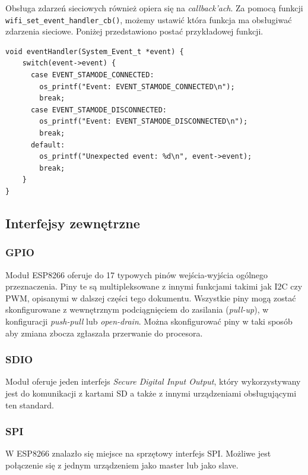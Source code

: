 Obsługa zdarzeń sieciowych również opiera się na \textit{callback'ach}. Za pomocą 
funkcji \verb+wifi_set_event_handler_cb()+, możemy ustawić która funkcja ma 
obsługiwać zdarzenia sieciowe. Poniżej przedstawiono postać przykładowej funkcji.\\

\begin{lstlisting}[style=customc,
    frame=single,
    caption={Przykładowa postać funkcji obsługującej zdarzenia sieciowe},
    captionpos=b,
    label={event_handler_cb}]
void eventHandler(System_Event_t *event) {
    switch(event->event) {
      case EVENT_STAMODE_CONNECTED:
        os_printf("Event: EVENT_STAMODE_CONNECTED\n");
        break;
      case EVENT_STAMODE_DISCONNECTED:
        os_printf("Event: EVENT_STAMODE_DISCONNECTED\n");
        break;
      default:
        os_printf("Unexpected event: %d\n", event->event);
        break;
    }
}
\end{lstlisting}

\subsection{Interfejsy zewnętrzne}
\label{interfejsy}

\subsubsection{GPIO}
\label{gpio}
Moduł ESP8266 oferuje do 17 typowych pinów wejścia-wyjścia ogólnego przeznaczenia. Piny
te są multipleksowane z innymi funkcjami takimi jak I2C czy PWM, opisanymi w dalszej 
części tego dokumentu. Wszystkie piny mogą zostać skonfigurowane z wewnętrznym 
podciągnięciem do zasilania (\textit{pull-up}), w konfiguracji \textit{push-pull} lub 
\textit{open-drain}. Można skonfigurować piny w taki sposób aby zmiana zbocza zgłaszała
przerwanie do procesora.


\subsubsection{SDIO}
\label{sdio}
Moduł oferuje jeden interfejs \textit{Secure Digital Input Output}, który wykorzystywany
jest do komunikacji z kartami SD a także z innymi urządzeniami obsługującymi ten standard.


\subsubsection{SPI}
\label{spi}
W ESP8266 znalazło się miejsce na sprzętowy interfejs SPI. Możliwe jest połączenie się z jednym
urządzeniem jako master lub jako slave.


